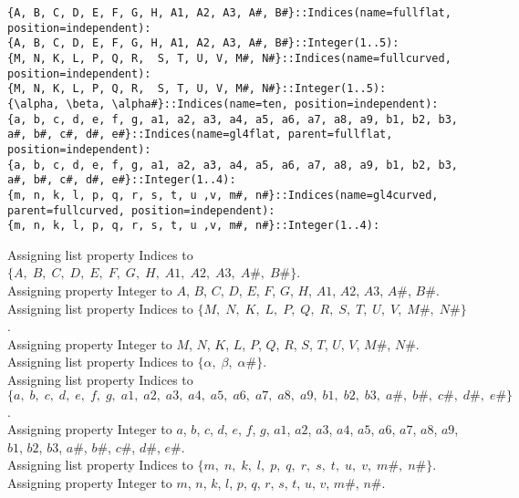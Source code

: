 \documentclass[11pt]{article}
\begin{document}
{\color[named]{Blue}\begin{verbatim}
{A, B, C, D, E, F, G, H, A1, A2, A3, A#, B#}::Indices(name=fullflat, position=independent):
{A, B, C, D, E, F, G, H, A1, A2, A3, A#, B#}::Integer(1..5):
{M, N, K, L, P, Q, R,  S, T, U, V, M#, N#}::Indices(name=fullcurved, position=independent):
{M, N, K, L, P, Q, R,  S, T, U, V, M#, N#}::Integer(1..5):
{\alpha, \beta, \alpha#}::Indices(name=ten, position=independent):
{a, b, c, d, e, f, g, a1, a2, a3, a4, a5, a6, a7, a8, a9, b1, b2, b3, a#, b#, c#, d#, e#}::Indices(name=gl4flat, parent=fullflat, position=independent):
{a, b, c, d, e, f, g, a1, a2, a3, a4, a5, a6, a7, a8, a9, b1, b2, b3, a#, b#, c#, d#, e#}::Integer(1..4):
{m, n, k, l, p, q, r, s, t, u ,v, m#, n#}::Indices(name=gl4curved, parent=fullcurved, position=independent):
{m, n, k, l, p, q, r, s, t, u ,v, m#, n#}::Integer(1..4):
\end{verbatim}}
Assigning list property Indices to $\{A,\; B,\; C,\; D,\; E,\; F,\; G,\; H,\; A1,\; A2,\; A3,\; A\#,\; B\#\}$.
\\
Assigning property Integer to $A$, $B$, $C$, $D$, $E$, $F$, $G$, $H$, $A1$, $A2$, $A3$, $A\#$, $B\#$.
\\
Assigning list property Indices to $\{M,\; N,\; K,\; L,\; P,\; Q,\; R,\; S,\; T,\; U,\; V,\; M\#,\; N\#\}$.
\\
Assigning property Integer to $M$, $N$, $K$, $L$, $P$, $Q$, $R$, $S$, $T$, $U$, $V$, $M\#$, $N\#$.
\\
Assigning list property Indices to $\{\alpha,\; \beta,\; \alpha\#\}$.
\\
Assigning list property Indices to $\{a,\; b,\; c,\; d,\; e,\; f,\; g,\; a1,\; a2,\; a3,\; a4,\; a5,\; a6,\; a7,\; a8,\; a9,\; b1,\; b2,\; b3,\; a\#,\; b\#,\; c\#,\; d\#,\; e\#\}$.
\\
Assigning property Integer to $a$, $b$, $c$, $d$, $e$, $f$, $g$, $a1$, $a2$, $a3$, $a4$, $a5$, $a6$, $a7$, $a8$, $a9$, $b1$, $b2$, $b3$, $a\#$, $b\#$, $c\#$, $d\#$, $e\#$.
\\
Assigning list property Indices to $\{m,\; n,\; k,\; l,\; p,\; q,\; r,\; s,\; t,\; u,\; v,\; m\#,\; n\#\}$.
\\
Assigning property Integer to $m$, $n$, $k$, $l$, $p$, $q$, $r$, $s$, $t$, $u$, $v$, $m\#$, $n\#$.
\end{document}
